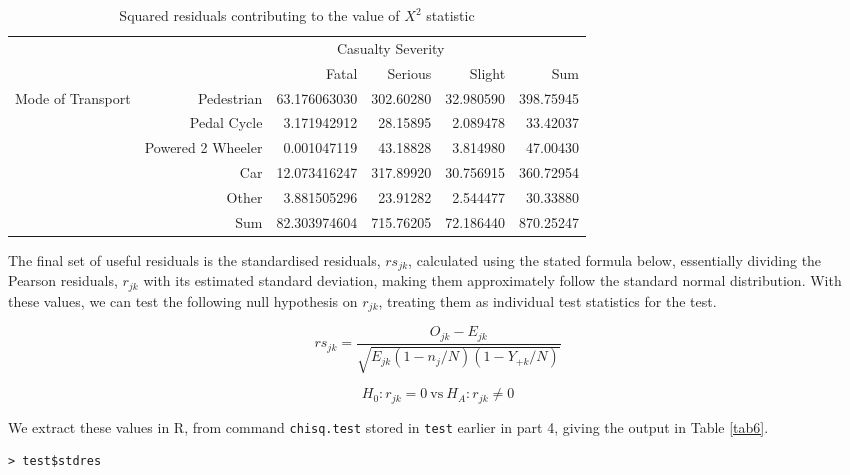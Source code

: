 \documentclass[11pt,a4]{article}
\begin{document}
\begin{enumerate}
\begin{table}[ht]
\centering
\begin{tabular}{rr|rrr|r}
    \multicolumn{2}{c}{\multirow{2}{*}{}}&\multicolumn{3}{|c|}{Casualty Severity} \\
    \multicolumn{2}{c|}{}& Fatal & Serious & Slight & Sum\\
  \hline
  \multirow{5}{*}{Mode of Transport} & Pedestrian & 63.176063030 & 302.60280 & 32.980590 & 398.75945 \\ 
  & Pedal Cycle &  3.171942912 & 28.15895 & 2.089478 & 33.42037 \\ 
  & Powered 2 Wheeler & 0.001047119 & 43.18828 & 3.814980 & 47.00430 \\ 
  & Car & 12.073416247 & 317.89920 & 30.756915 & 360.72954 \\ 
  & Other & 3.881505296 & 23.91282 & 2.544477 & 30.33880 \\ 
  \hline
  & Sum &  82.303974604 & 715.76205 & 72.186440 & 870.25247 \\ 
   \hline
\end{tabular}
\caption{Squared residuals contributing to the value of $X^2$ statistic}
\label{tab5}
\end{table}

The final set of useful residuals is the standardised residuals, $rs_{jk}$, calculated using the stated formula below, essentially dividing the Pearson residuals, $r_{jk}$ with its estimated standard deviation, making them approximately follow the standard normal distribution. With these values, we can test the following null hypothesis on $r_{jk}$, treating them as individual test statistics for the test.

\[ rs_{jk} = \frac{O_{jk} - E_{jk}}{\sqrt{E_{jk}(1-n_{j}/N)(1-Y_{+k}/N)}} \]

\[ H_{0}: r_{jk} = 0  \:\mbox{vs} \: H_{A}: r_{jk} \neq 0 \]

We extract these values in R, from command \verb|chisq.test| stored in \verb|test| earlier in part 4, giving the output in Table \ref{tab6}.

\begin{verbatim}
> test$stdres
\end{verbatim}


\end{enumerate}
\end{document}
